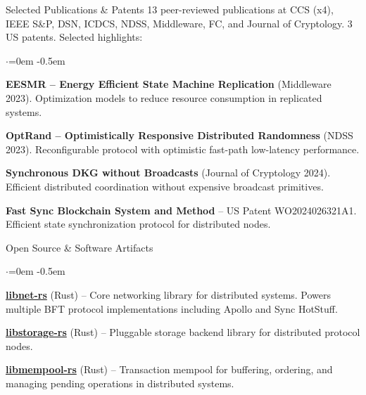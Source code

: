 \documentclass{resume}
\begin{document}
\begin{rSection}{Selected Publications \& Patents}
\label{sec:orga413ca0}
\vspace{0.5em}
13 peer-reviewed publications at CCS (x4), IEEE S\&P, DSN, ICDCS, NDSS, Middleware, FC, and Journal of Cryptology. 3 US patents. Selected highlights:
\begin{list}{$\cdot$}{\leftmargin=0em}
\itemsep -0.5em \vspace{-0.5em}
 \item  \textbf{EESMR -- Energy Efficient State Machine Replication} (Middleware 2023). Optimization models to reduce resource consumption in replicated systems.
 \item  \textbf{OptRand -- Optimistically Responsive Distributed Randomness} (NDSS 2023). Reconfigurable protocol with optimistic fast-path low-latency performance.
 \item  \textbf{Synchronous DKG without Broadcasts} (Journal of Cryptology 2024). Efficient distributed coordination without expensive broadcast primitives.
 \item  \textbf{Fast Sync Blockchain System and Method} -- US Patent WO2024026321A1. Efficient state synchronization protocol for distributed nodes.
\end{list}
\vspace{0.5em}
\end{rSection}
\begin{rSection}{Open Source \& Software Artifacts}
\label{sec:org98045ae}
\vspace{0.5em}
\begin{list}{$\cdot$}{\leftmargin=0em}
\itemsep -0.5em \vspace{-0.5em}
 \item  \textbf{\href{https://github.com/libdist-rs/libnet-rs}{libnet-rs}} (Rust) -- Core networking library for distributed systems. Powers multiple BFT protocol implementations including Apollo and Sync HotStuff.
 \item  \textbf{\href{https://github.com/libdist-rs/libstorage-rs}{libstorage-rs}} (Rust) -- Pluggable storage backend library for distributed protocol nodes.
 \item  \textbf{\href{https://github.com/libdist-rs/libmempool-rs}{libmempool-rs}} (Rust) -- Transaction mempool for buffering, ordering, and managing pending operations in distributed systems.
\end{list}
\end{rSection}
\end{document}
